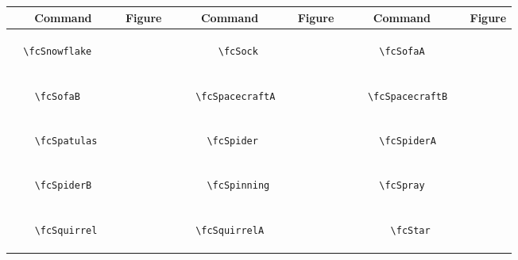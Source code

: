 \documentclass[x11names]{article}
\begin{document}
\begin{table}[H]\centering\begin{tabular}{|c|c|c|c|c|c|}\hline{\bf Command} & {\bf Figure} & {\bf Command} & {\bf Figure} & {\bf Command} & {\bf Figure}\\	\hline	&\multirow{5}{*}{	\fcSnowflake	[scale=0.4]} & &\multirow{5}{*}{	\fcSock	[scale=0.4]} & &\multirow{5}{*}{	\fcSofaA	[scale=0.3]}\\	& & & & & \\	& & & & & \\	\verb|	\fcSnowflake	| & & \verb|	\fcSock	| & & \verb|	\fcSofaA	| & \\	& & & & & \\	& & & & & \\	& & & & & \\	\hline									
		&\multirow{5}{*}{	\fcSofaB	[scale=0.3]} & &\multirow{5}{*}{	\fcSpacecraftA	[scale=0.4]} & &\multirow{5}{*}{	\fcSpacecraftB	[scale=0.4]}\\	& & & & & \\	& & & & & \\	\verb|	\fcSofaB	| & & \verb|	\fcSpacecraftA	| & & \verb|	\fcSpacecraftB	| & \\	& & & & & \\	& & & & & \\	& & & & & \\	\hline									
		&\multirow{5}{*}{	\fcSpatulas	[scale=0.4]} & &\multirow{5}{*}{	\fcSpider	[scale=0.8]} & &\multirow{5}{*}{	\fcSpiderA	[scale=0.4]}\\	& & & & & \\	& & & & & \\	\verb|	\fcSpatulas	| & & \verb|	\fcSpider	| & & \verb|	\fcSpiderA	| & \\	& & & & & \\	& & & & & \\	& & & & & \\	\hline									
		&\multirow{5}{*}{	\fcSpiderB	[scale=0.4]} & &\multirow{5}{*}{	\fcSpinning	[scale=0.8]} & &\multirow{5}{*}{	\fcSpray	[scale=0.4]}\\	& & & & & \\	& & & & & \\	\verb|	\fcSpiderB	| & & \verb|	\fcSpinning	| & & \verb|	\fcSpray	| & \\	& & & & & \\	& & & & & \\	& & & & & \\	\hline									
		&\multirow{5}{*}{	\fcSquirrel	[scale=0.8]} & &\multirow{5}{*}{	\fcSquirrelA	[scale=0.8]} & &\multirow{5}{*}{	\fcStar	[scale=0.4]}\\	& & & & & \\	& & & & & \\	\verb|	\fcSquirrel	| & & \verb|	\fcSquirrelA	| & & \verb|	\fcStar	| & \\	& & & & & \\	& & & & & \\	& & & & & \\	\hline									

\end{tabular}
\end{table}
\end{document}

